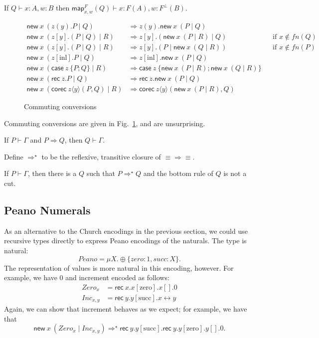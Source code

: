 \documentclass[orivec,envcountsame]{llncs}
\newcommand{\cpdual}[1]{#1^\perp}
\newcommand{\cptyp}[2]{#1 \vdash #2}
\newcommand{\mapname}{\mathsf{map}}
\newcommand{\map}[3]{\mapname^{#1}_{#2}(#3)}
\newcommand{\mkwd}[1]{\mathsf{#1}}
\newcommand{\link}[2]{#1 \leftrightarrow #2}
\newcommand{\cut}[4]{\mkwd{new}\:#1 \: (#3 \mid #4)}
\newcommand{\rec}[1]{\mkwd{rec}\:#1}
\newcommand{\corec}[5]{\mkwd{corec}\:#1 \langle #2 \rangle (#4,#5)}
\newcommand{\clabel}[1]{\mathrm{#1}}
\renewcommand{\case}[2]{\mkwd{case}\:#1\:\{#2\}}
\newcommand{\sel}[2]{#1[\clabel{#2}]}
\begin{document}
\begin{lemma}
  If $\cptyp{Q}{x:A,w:B}$ then \(\cptyp{\map{F}{x,w}{Q}}{x:F(A), w:\cpdual{F}(B)}.\)
\end{lemma}

\begin{figure}\small
\begin{align*}
  \cut{x}{A}{z(y).P}{Q} &\Longrightarrow z(y).\cut{x}{A}{P}{Q} \\
  \cut{x}{A}{z[y].(P \mid Q)}{R} &\Longrightarrow z[y].(\cut{x}{A}{P}{R} \mid Q) &&\text{if $x \not\in fn(Q)$} \\
  \cut{x}{A}{z[y].(P \mid Q)}{R} &\Longrightarrow z[y].(P \mid \cut{x}{A}{Q}{R}) &&\text{if $x \not\in fn(P)$} \\
  \cut{x}{A}{\sel{z}{inl}.P}{Q} &\Longrightarrow \sel{z}{inl}.\cut{x}{A}{P}{Q} \\
  \cut{x}{A}{\case{z}{P;Q}}{R} &\Longrightarrow \case{z}{\cut{x}{A}{P}{R}; \cut{x}{A}{Q}{R}} \\
  \cut{x}{A}{\rec{z}.P}{Q} &\Longrightarrow \rec{z}.\cut{x}{A}{P}{Q} \\
  \cut{x}{A}{\corec{z}{y}{B}{P}{Q}}{R} &\Longrightarrow \corec{z}{y}{B}{\cut{x}{A}{P}{R}}{Q}
\end{align*}
\caption{Commuting conversions}\label{fig:commuting}
\end{figure}

Commuting conversions are given in Fig.~\ref{fig:commuting}, and are unsurprising.

\begin{theorem}
  If $\cptyp{P}{\Gamma}$ and $P \Longrightarrow Q$, then $\cptyp{Q}{\Gamma}.$
\end{theorem}

Define $\Longrightarrow^\star$ to be the reflexive, transitive closure of $\equiv\Longrightarrow\equiv$.

\begin{theorem}
  If $\cptyp{P}{\Gamma}$, then there is a $Q$ such that $P \Longrightarrow^\star Q$ and the bottom
  rule of $Q$ is not a cut.
\end{theorem}

\subsection{Peano Numerals}

As an alternative to the Church encodings in the previous section, we could use recursive types
directly to express Peano encodings of the naturals.  The type is natural:
%
{\small\[
  Peano = \mu X.\oplus\{zero: 1, succ: X\}.
\]}
%
The representation of values is more natural in this encoding, however.  For example, we have 0 and
increment encoded as follows:
%
{\small\begin{align*}
  Zero_x &= \rec{x}.\sel{x}{zero}.x[].0 \\
  Inc_{x,y} &= \rec{y}.\sel{y}{succ}.\link{x}{y}
\end{align*}}
Again, we can show that increment behaves as we expect; for example, we have that
%
{\small\[
  \cut{x}{Peano}{Zero_x}{Inc_{x,y}} \Longrightarrow^\star \rec{y}.\sel{y}{succ}.\rec{y}.\sel{y}{zero}.y[].0.
\]}
\end{document}
